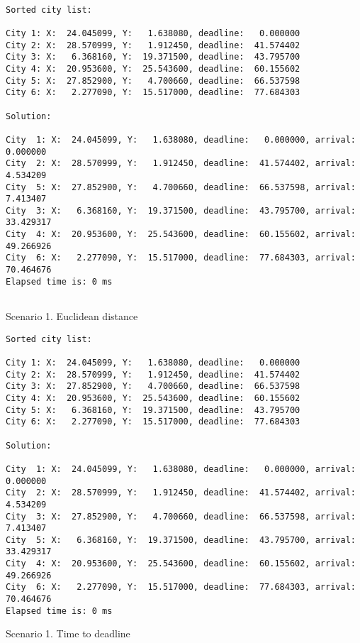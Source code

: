\documentclass[a4paper, 12pt]{article}
\begin{document}
\begin{lstlisting}

Sorted city list:

City 1: X:  24.045099, Y:   1.638080, deadline:   0.000000
City 2: X:  28.570999, Y:   1.912450, deadline:  41.574402
City 3: X:   6.368160, Y:  19.371500, deadline:  43.795700
City 4: X:  20.953600, Y:  25.543600, deadline:  60.155602
City 5: X:  27.852900, Y:   4.700660, deadline:  66.537598
City 6: X:   2.277090, Y:  15.517000, deadline:  77.684303

Solution: 

City  1: X:  24.045099, Y:   1.638080, deadline:   0.000000, arrival:   0.000000
City  2: X:  28.570999, Y:   1.912450, deadline:  41.574402, arrival:   4.534209
City  5: X:  27.852900, Y:   4.700660, deadline:  66.537598, arrival:   7.413407
City  3: X:   6.368160, Y:  19.371500, deadline:  43.795700, arrival:  33.429317
City  4: X:  20.953600, Y:  25.543600, deadline:  60.155602, arrival:  49.266926
City  6: X:   2.277090, Y:  15.517000, deadline:  77.684303, arrival:  70.464676
Elapsed time is: 0 ms


\end{lstlisting}

Scenario 1. Euclidean distance

\begin{lstlisting}
Sorted city list:

City 1: X:  24.045099, Y:   1.638080, deadline:   0.000000
City 2: X:  28.570999, Y:   1.912450, deadline:  41.574402
City 3: X:  27.852900, Y:   4.700660, deadline:  66.537598
City 4: X:  20.953600, Y:  25.543600, deadline:  60.155602
City 5: X:   6.368160, Y:  19.371500, deadline:  43.795700
City 6: X:   2.277090, Y:  15.517000, deadline:  77.684303

Solution: 

City  1: X:  24.045099, Y:   1.638080, deadline:   0.000000, arrival:   0.000000
City  2: X:  28.570999, Y:   1.912450, deadline:  41.574402, arrival:   4.534209
City  3: X:  27.852900, Y:   4.700660, deadline:  66.537598, arrival:   7.413407
City  5: X:   6.368160, Y:  19.371500, deadline:  43.795700, arrival:  33.429317
City  4: X:  20.953600, Y:  25.543600, deadline:  60.155602, arrival:  49.266926
City  6: X:   2.277090, Y:  15.517000, deadline:  77.684303, arrival:  70.464676
Elapsed time is: 0 ms

\end{lstlisting}

Scenario 1. Time to deadline
\end{document}
